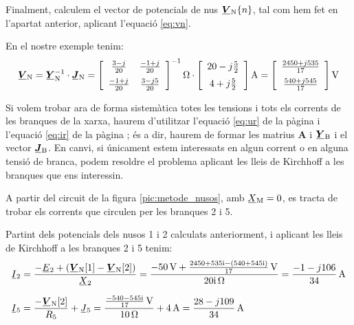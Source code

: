 Finalment,
calculem el vector de potencials de nus $\mcmplx{V}\ped{N}\{n\}$, tal
com  hem fet en l'apartat anterior, aplicant l'equació \eqref{eq:vn}.

En el nostre exemple tenim:
\[
   \mcmplx{V}\ped{N} = \mcmplx{Y}\ped{N}^{-1} \cdot \mcmplx{J}\ped{N} =
   \begin{bmatrix}\begin{array}{cc}
         \frac{3 - j}{20}  & \frac{-1 + j}{20} \\[2mm]
         \frac{-1 + j}{20} & \frac{3 - j 5}{20}
   \end{array}\end{bmatrix} ^{-1}\unit{\ohm} \cdot
   \begin{bmatrix}\begin{array}{c}
            20 - j \frac{5}{2} \\[2mm]
            4 + j \frac{5}{2}
   \end{array}\end{bmatrix}\unit{A} =
   \begin{bmatrix}\begin{array}{c}
         \frac{2450 + j 535}{17} \\[2mm]
         \frac{540  + j 545}{17}
   \end{array}\end{bmatrix}\unit{V}
\]

Si volem trobar ara de forma sistemàtica totes les tensions i tots
els corrents   de les branques de la xarxa, haurem d'utilitzar
l'equació \eqref{eq:ur} de la pàgina \pageref{eq:ur} i l'equació
\eqref{eq:ir} de la pàgina \pageref{eq:ir}; és a dir, haurem
de formar les matrius $\boldsymbol{A}$ i $\mcmplx{Y}\ped{B}$ i el
vector $\mcmplx{J}\ped{B}$. En canvi, si únicament estem
interessats en algun corrent o en alguna tensió de branca, podem
resoldre el problema aplicant les lleis de Kirchhoff a les branques
que ens interessin.

	
\begin{exemple}\label{ex:XarxaSenseAcobl}
	\addcontentsxms{\XarxaSenseAcobl}
    A partir del circuit de la figura \vref{pic:metode_nusos}, amb
    $\cmplx{X}\ped{M}=0$, es tracta de trobar els corrents que circulen
    per les branques 2 i 5.

    Partint dels potencials dels nusos 1 i 2 calculats anteriorment, i
    aplicant les lleis de Kirchhoff a les branques 2 i 5 tenim:
    \begin{align*}
       \cmplx{I}_2 &= \frac{-\cmplx{E}_2 + (\mcmplx{V}\ped{N}[1] - \mcmplx{V}\ped{N}[2])}
                      {\cmplx{X}_2} = \frac{\qty{-50}{V} + \frac{\complexnum{2450+j535} - (\complexnum{540+
                      j545})}{17}\,\unit{V}}{\complexqty{j20}{\ohm}} = \frac{-1 - j 106}{34}\unit{\,A} \\[1.5ex]
       \cmplx{I}_5 &=  \frac{- \mcmplx{V}\ped{N}[2]}{R_5}  + \cmplx{J}_5 =                       \frac{\frac{\complexnum{-540-j545}}{17}\,\unit{V}}{\qty{10}{\ohm}} + \qty{4}{A} = \frac{28 - j 109}{34}\unit{\,A}
    \end{align*}
\end{exemple}

